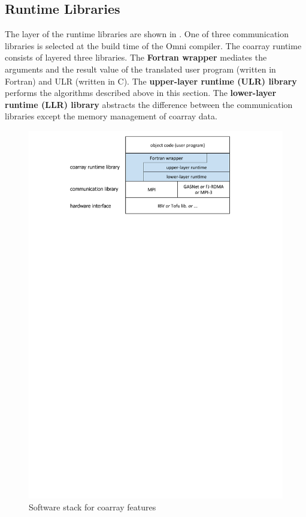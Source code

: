 \subsection{Runtime Libraries}\label{sec:runtime}

The layer of the runtime libraries are shown in .
One of three communication libraries is selected 
at the build time of the Omni compiler.
The coarray runtime consists of layered three libraries.
%
The {\bf Fortran wrapper} mediates the arguments and the result value 
of the translated user program (written in Fortran) and ULR (written in C).
%
The {\bf upper-layer runtime (ULR) library} performs the algorithms 
described above in this section.
%
The {\bf lower-layer runtime (LLR) library} abstracts the difference between 
the communication libraries except the memory management of coarray data.

\begin{figure}[tbh]
  \begin{center}
    \mbox{\includegraphics[trim=27mm 208mm 29mm 0mm, scale=0.7,clip]{figs/softstack-r4.pdf}}
    \caption{Software stack for coarray features}\label{fig:layer}
  \end{center}
\end{figure}


